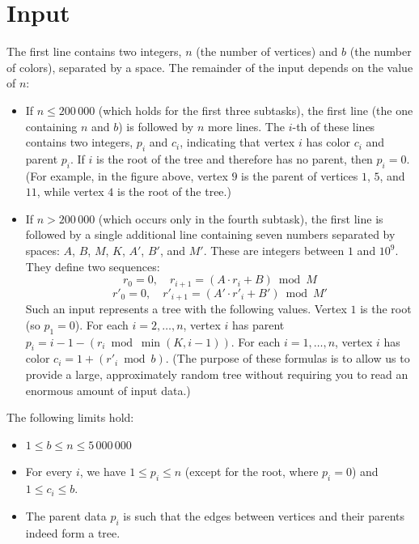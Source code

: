 \section*{Input}
The first line contains two integers, $n$ (the number of vertices) and $b$ (the
number of colors), separated by a space. The remainder of the input depends on
the value of $n$:
\begin{itemize}
  \item If $n \leq 200\,000$ (which holds for the first three subtasks), the
        first line (the one containing $n$ and $b$) is followed by $n$ more
        lines. The $i$-th of these lines contains two integers, $p_i$ and $c_i$,
        indicating that vertex $i$ has color $c_i$ and parent $p_i$. If $i$ is
        the root of the tree and therefore has no parent, then $p_i = 0$. (For
        example, in the figure above, vertex $9$ is the parent of vertices $1$,
        $5$, and $11$, while vertex $4$ is the root of the tree.)
  \item If $n > 200\,000$ (which occurs only in the fourth subtask), the first
        line is followed by a single additional line containing seven numbers
        separated by spaces: $A$, $B$, $M$, $K$, $A'$, $B'$, and $M'$. These are
        integers between $1$ and $10^9$. They define two sequences:
        \[ r_0 = 0, \quad r_{i+1} = (A \cdot r_i + B) \bmod M \]
        \[ r'_0 = 0, \quad r'_{i+1} = (A' \cdot r'_i + B') \bmod M' \]
        Such an input represents a tree with the following values. Vertex $1$ is
        the root (so $p_1 = 0$). For each $i = 2, \ldots, n$, vertex $i$ has
        parent $p_i = i - 1 - \left( r_i \bmod \min(K, i-1) \right)$. For each
        $i = 1, \ldots, n$, vertex $i$ has color $c_i = 1 + (r'_i \bmod b)$.
        (The purpose of these formulas is to allow us to provide a large,
        approximately random tree without requiring you to read an enormous
        amount of input data.)
\end{itemize}

The following limits hold:
\begin{itemize}
  \item $1 \leq b \leq n \leq 5\,000\,000$
  \item For every $i$, we have $1 \leq p_i \leq n$ (except for the root, where
        $p_i = 0$) and $1 \leq c_i \leq b$.
  \item The parent data $p_i$ is such that the edges between vertices and their
        parents indeed form a tree.
\end{itemize}

